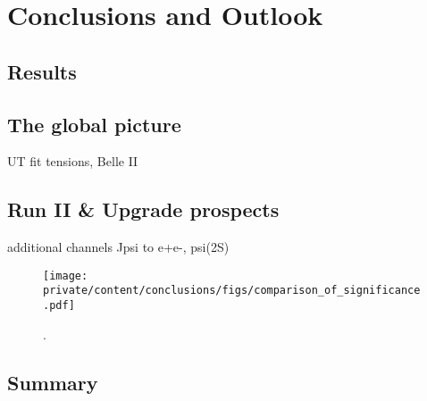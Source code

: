 
\chapter{Conclusions and Outlook}
\section{Results}
\section{The global picture}
UT fit tensions, Belle II
\section{Run II \& Upgrade prospects}
additional channels Jpsi to e+e-, psi(2S)

\begin{figure}
  \centering
  \texttt{[image: private/content/conclusions/figs/comparison\_of\_significance.pdf]}
  \caption{. \cite{Moedden:2015}}
  \label{fig:measurement_of_sin2beta:cpv_measurement:results:plots:ll_scan}
\end{figure}

\section{Summary}

